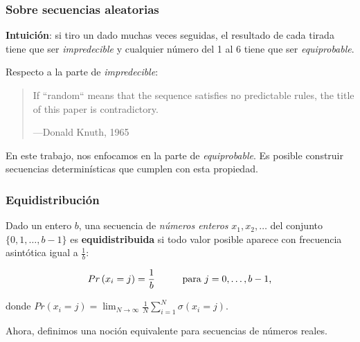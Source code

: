 \documentclass[t, 10pt, mathserif]{beamer}
\begin{document}

\begin{frame}
  \frametitle{Sobre secuencias aleatorias}

  \textbf{Intuición}: si tiro un dado muchas veces seguidas, el resultado de cada tirada tiene que ser \textit{impredecible} y cualquier número del 1 al 6 tiene que ser \textit{equiprobable}.
  \pause

  Respecto a la parte de \textit{impredecible}:
  \begin{quote}
    If ``random`` means that the sequence satisfies no predictable rules, the title of this paper is contradictory.
    \begin{flushright}
      \small{---Donald Knuth, 1965}
    \end{flushright}
  \end{quote}
  \pause

  En este trabajo, nos enfocamos en la parte de \textit{equiprobable}. \pause Es posible construir secuencias determinísticas que cumplen con esta propiedad.
\end{frame}


\begin{frame}
  \frametitle{Equidistribución}

  \begin{definition}
    Dado un entero $b$, una secuencia de \textit{números enteros} $x_1, x_2, \dots$ del conjunto $\{ 0, 1, \dots, b - 1 \}$ es \textbf{equidistribuida} si todo valor posible aparece con frecuencia asintótica igual a $\frac{1}{b}$:
    \pause

    \begin{equation*}
      \begin{aligned}
        Pr \left( x_i = j \right) = \frac{1}{b} \hspace*{1cm} \text{para } j = 0, \dots, b - 1 \text{,}
      \end{aligned}
    \end{equation*}

    donde $Pr(x_i = j) = \lim_{N \to \infty} \frac{1}{N} \sum_{i = 1}^{N} \sigma(x_i = j)$.
  \end{definition}
  \pause

  Ahora, definimos una noción equivalente para secuencias de números reales.
\end{frame}
\end{document}
